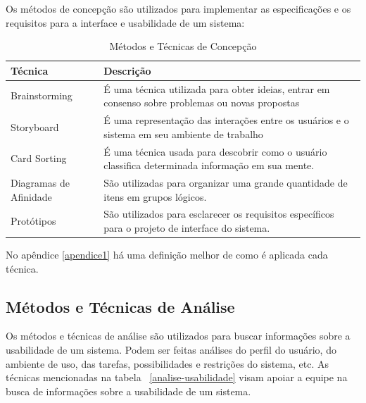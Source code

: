 Os métodos de concepção são utilizados para implementar as especificações e os requisitos para a interface e usabilidade de um sistema:

\newpage

\begin{table}[h]
\centering
\begin{tabular}{|p{4cm}|p{8cm}|}
\hline 
Técnica & Descrição \\ 
\hline 
Brainstorming & É uma técnica utilizada para obter ideias, entrar em consenso sobre problemas ou novas propostas \\ 
\hline 
Storyboard & É uma representação das interações entre os usuários e o sistema em seu ambiente de trabalho \\ 
\hline 
Card Sorting & É uma técnica usada para descobrir como o usuário classifica determinada informação em sua mente. \\ 
\hline 
Diagramas de Afinidade & São utilizadas para organizar uma grande quantidade de itens em grupos lógicos. \\ 
\hline 
Protótipos & São utilizados para esclarecer os requisitos específicos para o projeto de interface do sistema. \\ 
\hline 
\end{tabular}
\caption{Métodos e Técnicas de Concepção}
\end{table}


No apêndice \ref{apendice1} há uma definição melhor de como é aplicada cada técnica.


\subsection{Métodos e Técnicas de Análise}

Os métodos e técnicas de análise são utilizados para buscar informações sobre a usabilidade de um sistema. Podem ser feitas análises do perfil do usuário, do ambiente de uso, das tarefas, possibilidades e restrições do sistema, etc. As técnicas mencionadas na tabela ~\ref{analise-usabilidade} visam apoiar a equipe na busca de informações sobre a usabilidade de um sistema. 

\newpage

